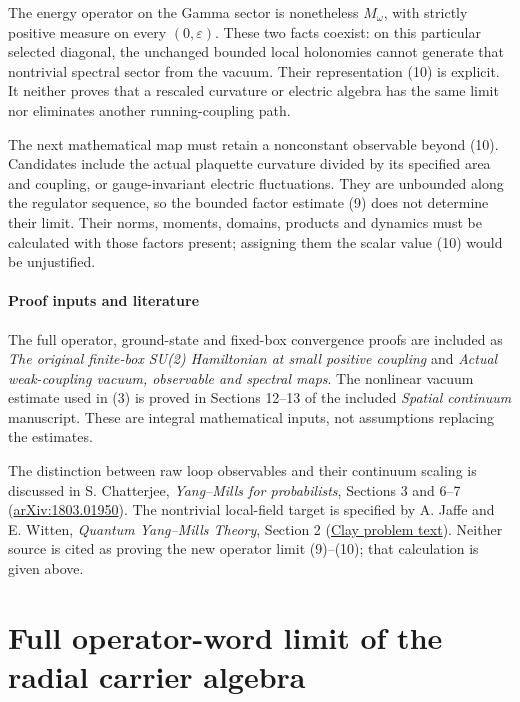 \documentclass[
  11pt,
]{article}
\begin{document}
The energy operator on the Gamma sector is nonetheless \(M_\omega\),
with strictly positive measure on every \((0,\varepsilon)\). These two
facts coexist: on this particular selected diagonal, the unchanged
bounded local holonomies cannot generate that nontrivial spectral sector
from the vacuum. Their representation (10) is explicit. It neither
proves that a rescaled curvature or electric algebra has the same limit
nor eliminates another running-coupling path.

The next mathematical map must retain a nonconstant observable beyond
(10). Candidates include the actual plaquette curvature divided by its
specified area and coupling, or gauge-invariant electric fluctuations.
They are unbounded along the regulator sequence, so the bounded factor
estimate (9) does not determine their limit. Their norms, moments,
domains, products and dynamics must be calculated with those factors
present; assigning them the scalar value (10) would be unjustified.

\subsection{Proof inputs and
literature}\label{weak-coupling-part-6-proof-inputs-and-literature}

The full operator, ground-state and fixed-box convergence proofs are
included as \emph{The original finite-box SU(2) Hamiltonian at small
positive coupling} and \emph{Actual weak-coupling vacuum, observable and
spectral maps}. The nonlinear vacuum estimate used in (3) is proved in
Sections 12--13 of the included \emph{Spatial continuum} manuscript.
These are integral mathematical inputs, not assumptions replacing the
estimates.

The distinction between raw loop observables and their continuum scaling
is discussed in S. Chatterjee, \emph{Yang--Mills for probabilists},
Sections 3 and 6--7
(\href{https://arxiv.org/abs/1803.01950}{arXiv:1803.01950}). The
nontrivial local-field target is specified by A. Jaffe and E. Witten,
\emph{Quantum Yang--Mills Theory}, Section 2
(\href{https://www.claymath.org/wp-content/uploads/2022/06/yangmills.pdf}{Clay
problem text}). Neither source is cited as proving the new operator
limit (9)--(10); that calculation is given above.

\clearpage
\part{Full operator-word limit of the radial carrier algebra}
\end{document}
